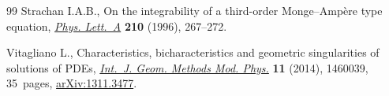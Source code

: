 \begin{thebibliography}{99}
Strachan I.A.B., On the integrability of a third-order {M}onge--{A}mp\`ere type
 equation, \href{http://dx.doi.org/10.1016/0375-9601(95)00944-2}{\textit{Phys. Lett.~A}} \textbf{210} (1996), 267--272.

Vitagliano L., Characteristics, bicharacteristics and geometric singularities
 of solutions of {PDE}s, \href{http://dx.doi.org/10.1142/S0219887814600391}{\textit{Int.~J. Geom. Methods Mod. Phys.}} \textbf{11}
 (2014), 1460039, 35~pages, \href{http://arxiv.org/abs/1311.3477}{arXiv:1311.3477}.

\end{thebibliography}
